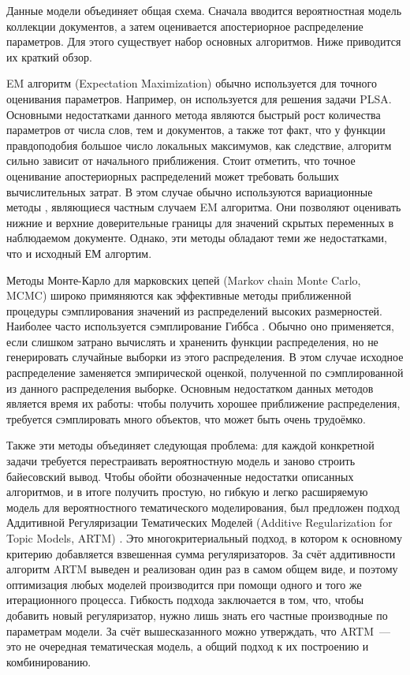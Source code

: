 \documentclass[12pt, twoside]{article}
\begin{document}
Данные модели объединяет общая схема. Сначала вводится вероятностная модель коллекции документов, а затем оценивается  апостериорное распределение  параметров. Для этого существует набор основных алгоритмов. Ниже приводится их краткий обзор.

EM алгоритм (Expectation Maximization) \cite{bilmes1998gentle} обычно используется для  точного оценивания параметров. Например, он используется для решения задачи PLSA. Основными недостатками данного метода являются быстрый рост количества параметров от числа слов, тем и документов, а также тот факт, что у функции правдоподобия большое число локальных максимумов, как следствие, алгоритм сильно зависит от начального приближения. Стоит отметить, что точное оценивание апостериорных распределений может требовать больших вычислительных затрат. В этом случае обычно используются вариационные методы \cite{jordan1999introduction}, являющиеся частным случаем EM алгоритма. Они  позволяют оценивать нижние и верхние доверительные границы для значений скрытых переменных в наблюдаемом документе. Однако, эти методы обладают теми же недостатками, что и исходный ЕМ алгортим.

Методы Монте-Карло для марковских цепей (Markov chain Monte Carlo, MCMC) \cite{gilks1996introducing,andrieu2003introduction} широко примяняются как эффективные методы приближенной процедуры сэмплирования значений из распределений высоких размерностей. Наиболее часто используется сэмплирование Гиббса \cite{griffiths2004finding}.  Обычно оно применяется, если слишком затрано вычислять и храненить функции распределения,  но не генерировать случайные выборки из этого распределения. В этом случае исходное распределение заменяется эмпирической оценкой, полученной по  сэмплированной из данного распределения выборке. Основным недостатком данных методов является время их работы: чтобы получить хорошее приближение распределения, требуется сэмплировать много объектов, что может быть очень трудоёмко. 

Также эти методы объединяет следующая проблема:  для каждой конкретной задачи требуется перестраивать вероятностную модель и заново строить байесовский вывод. Чтобы обойти обозначенные недостатки описанных алгоритмов, и в итоге получить простую, но гибкую и легко расширяемую модель для вероятностного тематического моделирования, был предложен подход Аддитивной Регуляризации Тематических Моделей (Additive Regularization for Topic Models, ARTM) \cite{vorontsov2014additive,vorontsov2014tutorial,vorontsov2015additive}. Это многокритериальный подход, в котором к основному критерию добавляется взвешенная сумма регуляризаторов. За счёт аддитивности алгоритм ARTM  выведен и реализован один раз в самом общем виде, и поэтому оптимизация любых моделей  производится при помощи одного и того же итерационного процесса. Гибкость подхода заключается в том, что, чтобы добавить новый регуляризатор, нужно лишь знать его частные производные по параметрам модели. За счёт вышесказанного можно утверждать, что ARTM~---  это не очередная тематическая модель, а общий подход к их  построению и комбинированию. 
\end{document}
